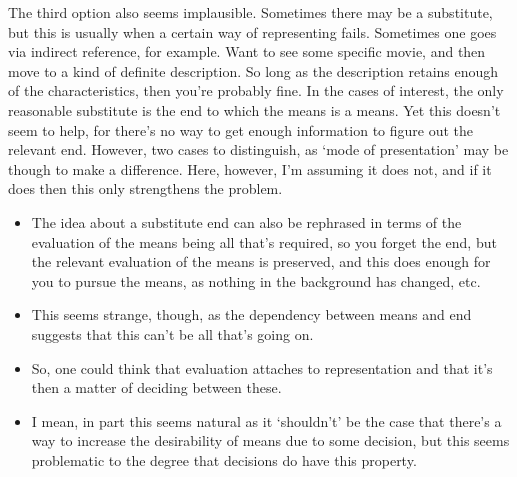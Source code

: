 \documentclass[10pt]{article}
\begin{document}
The third option also seems implausible.
Sometimes there may be a substitute, but this is usually when a certain way of representing fails.
Sometimes one goes via indirect reference, for example.
Want to see some specific movie, and then move to a kind of definite description.
So long as the description retains enough of the characteristics, then you're probably fine.
In the cases of interest, the only reasonable substitute is the end to which the means is a means.
Yet this doesn't seem to help, for there's no way to get enough information to figure out the relevant end.
However, two cases to distinguish, as `mode of presentation' may be though to make a difference.
Here, however, I'm assuming it does not, and if it does then this only strengthens the problem.
\begin{itemize}
\item The idea about a substitute end can also be rephrased in terms of the evaluation of the means being all that's required, so you forget the end, but the relevant evaluation of the means is preserved, and this does enough for you to pursue the means, as nothing in the background has changed, etc.
\item This seems strange, though, as the dependency between means and end suggests that this can't be all that's going on.
\item So, one could think that evaluation attaches to representation and that it's then a matter of deciding between these.
\item I mean, in part this seems natural as it `shouldn't' be the case that there's a way to increase the desirability of means due to some decision, but this seems problematic to the degree that decisions do have this property.
\end{itemize}
\end{document}
